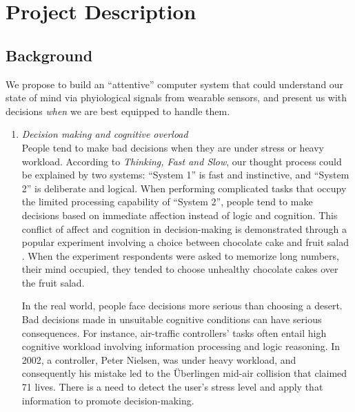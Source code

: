 \documentclass[12pt]{article}
\begin{document}


\section{Project Description}\label{project-description}

\subsection{Background}\label{background}

We propose to build an ``attentive'' computer system that could understand our state of mind via phyiological signals from wearable sensors, and present us with decisions {\it when} we are best equipped to handle them. 



\begin{enumerate}
\def\labelenumi{\noindent \alph{enumi}.}
\itemsep0pt\parskip0pt
\item{\it Decision making and cognitive overload}\\
  People tend to make bad decisions when they are under stress or heavy workload. 
  According to {\it Thinking, Fast and Slow}, our thought process could be explained by two systems: ``System 1'' is fast and instinctive, and ``System 2'' is deliberate and logical. When performing complicated tasks that occupy the limited processing capability of ``System 2'', people tend to make decisions based on immediate affection instead of logic and cognition. This conflict of affect and cognition in decision-making is demonstrated through a popular experiment involving a choice between chocolate cake and fruit salad \cite{Fedorikhin2014}. When the experiment respondents were asked to memorize long numbers, their mind occupied, they tended to choose unhealthy chocolate cakes over the fruit salad. 


  \hspace{15pt} In the real world, people face decisions more serious than choosing a desert. Bad decisions made in unsuitable cognitive conditions can have serious consequences. For instance, air-traffic controllers' tasks often entail high cognitive workload involving information processing and logic reasoning. In 2002, a controller, Peter Nielsen, was under heavy workload, and consequently his mistake led to the \"{U}berlingen mid-air collision that claimed 71 lives. There is a need to detect the user's stress level and apply that information to promote decision-making.\\


\end{enumerate}
\end{document}
